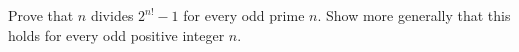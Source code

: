 Prove that $n$ divides $2^{n!}-1$ for every odd prime $n$. Show more generally that this holds for every odd positive integer $n$.
